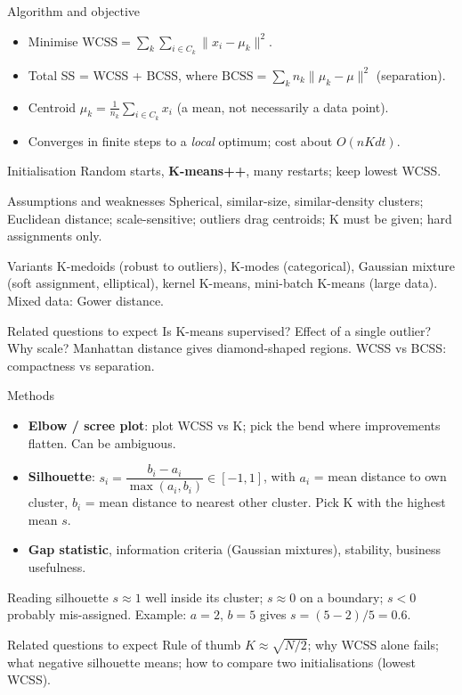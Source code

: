{\begin{block}{Algorithm and objective}
		\begin{itemize}
			\item Minimise $\text{WCSS}=\sum_k\sum_{i\in C_k}\lVert x_i-\mu_k\rVert^2$.
			\item Total SS = WCSS + BCSS, where $\text{BCSS}=\sum_k n_k\lVert\mu_k-\mu\rVert^2$ (separation).
			\item Centroid $\mu_k=\frac{1}{n_k}\sum_{i\in C_k}x_i$ (a mean, not necessarily a data point).
			\item Converges in finite steps to a \emph{local} optimum; cost about $O(nKdt)$.
	\end{itemize}\end{block}
	\begin{block}{Initialisation}
		Random starts, \textbf{K-means++}, many restarts; keep lowest WCSS.
\end{block}}
{\begin{block}{Assumptions and weaknesses}
		Spherical, similar-size, similar-density clusters; Euclidean distance; scale-sensitive; outliers drag centroids; K must be given; hard assignments only.
	\end{block}
	\begin{block}{Variants}
		K-medoids (robust to outliers), K-modes (categorical), Gaussian mixture (soft assignment, elliptical), kernel K-means, mini-batch K-means (large data). Mixed data: Gower distance.
	\end{block}
	\begin{alertblock}{Related questions to expect}
		Is K-means supervised? Effect of a single outlier? Why scale? Manhattan distance gives diamond-shaped regions. WCSS vs BCSS: compactness vs separation.
\end{alertblock}}

{\begin{block}{Methods}
		\begin{itemize}
			\item \textbf{Elbow / scree plot}: plot WCSS vs K; pick the bend where improvements flatten. Can be ambiguous.
			\item \textbf{Silhouette}: $s_i=\dfrac{b_i-a_i}{\max(a_i,b_i)}\in[-1,1]$, with $a_i$ = mean distance to own cluster, $b_i$ = mean distance to nearest other cluster. Pick K with the highest mean $s$.
			\item \textbf{Gap statistic}, information criteria (Gaussian mixtures), stability, business usefulness.
\end{itemize}\end{block}}
{\begin{block}{Reading silhouette}
		$s\approx1$ well inside its cluster; $s\approx0$ on a boundary; $s<0$ probably mis-assigned.
		Example: $a=2$, $b=5$ gives $s=(5-2)/5=0.6$.
	\end{block}
	\begin{alertblock}{Related questions to expect}
		Rule of thumb $K\approx\sqrt{N/2}$; why WCSS alone fails; what negative silhouette means; how to compare two initialisations (lowest WCSS).
\end{alertblock}}

